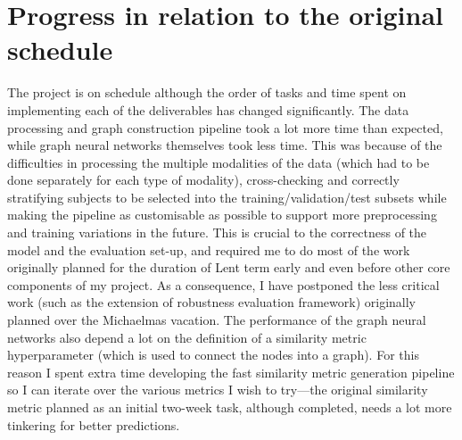 \documentclass[12pt]{article}
\begin{document}
\section*{Progress in relation to the original schedule}
The project is on schedule although the order of tasks and time spent on implementing each of the deliverables has changed significantly. The data processing and graph construction pipeline took a lot more time than expected, while graph neural networks themselves took less time. This was because of the difficulties in processing the multiple modalities of the data (which had to be done separately for each type of modality), cross-checking and correctly stratifying subjects to be selected into the training/validation/test subsets while making the pipeline as customisable as possible to support more preprocessing and training variations in the future. This is crucial to the correctness of the model and the evaluation set-up, and required me to do most of the work originally planned for the duration of Lent term early and even before other core components of my project. As a consequence, I have postponed the less critical work (such as the extension of robustness evaluation framework) originally planned over the Michaelmas vacation. The performance of the graph neural networks also depend a lot on the definition of a similarity metric hyperparameter (which is used to connect the nodes into a graph). For this reason I spent extra time developing the fast similarity metric generation pipeline so I can iterate over the various metrics I wish to try—the original similarity metric planned as an initial two-week task, although completed, needs a lot more tinkering for better predictions.
\end{document}
